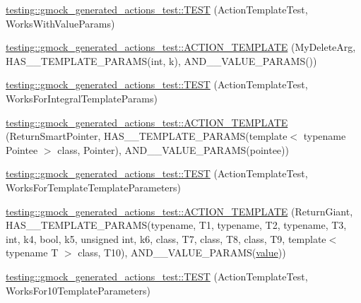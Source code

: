 \begin{DoxyCompactItemize}
\item 
\mbox{\hyperlink{namespacetesting_1_1gmock__generated__actions__test_a21f6e2ad5c4c1afecca93a42c9a84f1a}{testing\+::gmock\+\_\+generated\+\_\+actions\+\_\+test\+::\+T\+E\+ST}} (Action\+Template\+Test, Works\+With\+Value\+Params)
\item 
\mbox{\hyperlink{namespacetesting_1_1gmock__generated__actions__test_aaaac0fbf0bf2c7bd8fc104310e6af25c}{testing\+::gmock\+\_\+generated\+\_\+actions\+\_\+test\+::\+A\+C\+T\+I\+O\+N\+\_\+\+T\+E\+M\+P\+L\+A\+TE}} (My\+Delete\+Arg, H\+A\+S\+\_\+\_\+\+T\+E\+M\+P\+L\+A\+T\+E\+\_\+\+P\+A\+R\+A\+MS(int, k), A\+N\+D\+\_\+\_\+\+V\+A\+L\+U\+E\+\_\+\+P\+A\+R\+A\+MS())
\item 
\mbox{\hyperlink{namespacetesting_1_1gmock__generated__actions__test_aad8d77a35ac21f366dc334a45cf5b140}{testing\+::gmock\+\_\+generated\+\_\+actions\+\_\+test\+::\+T\+E\+ST}} (Action\+Template\+Test, Works\+For\+Integral\+Template\+Params)
\item 
\mbox{\hyperlink{namespacetesting_1_1gmock__generated__actions__test_ad99d926be507eb0c031538da2e8bb838}{testing\+::gmock\+\_\+generated\+\_\+actions\+\_\+test\+::\+A\+C\+T\+I\+O\+N\+\_\+\+T\+E\+M\+P\+L\+A\+TE}} (Return\+Smart\+Pointer, H\+A\+S\+\_\+\_\+\+T\+E\+M\+P\+L\+A\+T\+E\+\_\+\+P\+A\+R\+A\+MS(template$<$ typename Pointee $>$ class, Pointer), A\+N\+D\+\_\+\_\+\+V\+A\+L\+U\+E\+\_\+\+P\+A\+R\+A\+MS(pointee))
\item 
\mbox{\hyperlink{namespacetesting_1_1gmock__generated__actions__test_a8908d6badc9054adebdaf5ed8d455c2d}{testing\+::gmock\+\_\+generated\+\_\+actions\+\_\+test\+::\+T\+E\+ST}} (Action\+Template\+Test, Works\+For\+Template\+Template\+Parameters)
\item 
\mbox{\hyperlink{namespacetesting_1_1gmock__generated__actions__test_aea61dba8f93605f3e8c1cdedfd1079f5}{testing\+::gmock\+\_\+generated\+\_\+actions\+\_\+test\+::\+A\+C\+T\+I\+O\+N\+\_\+\+T\+E\+M\+P\+L\+A\+TE}} (Return\+Giant, H\+A\+S\+\_\+\_\+\+T\+E\+M\+P\+L\+A\+T\+E\+\_\+\+P\+A\+R\+A\+MS(typename, T1, typename, T2, typename, T3, int, k4, bool, k5, unsigned int, k6, class, T7, class, T8, class, T9, template$<$ typename T $>$ class, T10), A\+N\+D\+\_\+\_\+\+V\+A\+L\+U\+E\+\_\+\+P\+A\+R\+A\+MS(\mbox{\hyperlink{_obj__test_2lib_2googletest-master_2googlemock_2test_2gmock-matchers__test_8cc_a337b8a670efc0b086ad3af163f3121b6}{value}}))
\item 
\mbox{\hyperlink{namespacetesting_1_1gmock__generated__actions__test_a39707e50b998b0866ea7dec54099f38f}{testing\+::gmock\+\_\+generated\+\_\+actions\+\_\+test\+::\+T\+E\+ST}} (Action\+Template\+Test, Works\+For10\+Template\+Parameters)

\end{DoxyCompactItemize}

